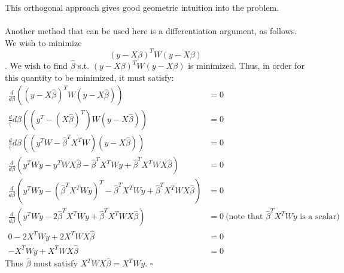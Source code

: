\documentclass[12pt]{article}
\newenvironment{problem}[2][Exercise]{\begin{trivlist}
\item[\hskip \labelsep {\bfseries #1}\hskip \labelsep {\bfseries #2.}]}{\end{trivlist}}
\begin{document}
\begin{problem}{A}
This orthogonal approach gives good geometric intuition into the problem. 
\\\\Another method that can be used here is a differentiation argument, as follows.
We wish to minimize $$(y - X\beta)^T W (y-X\beta)$$.
We wish to find $\hat{\beta}$ s.t. $(y - X\beta)^T W (y-X\beta)$ is minimized.
Thus, in order for this quantity to be minimized, it must satisfy:
\begin{align*}
\frac{d}{d\beta}\left((y - X\hat{\beta})^T W (y-X\hat{\beta}) \right)&= 0\\
\frac{d}({d\beta}\left((y^T - (X\hat{\beta})^T)W (y - X\hat{\beta}) \right)&= 0 \\
\frac{d}({d\beta}\left((y^TW - \hat{\beta}^TX^TW)(y - X\hat{\beta})\right) &= 0\\
\frac{d}{d\beta}\left(y^TWy - y^TWX\hat{\beta} - \hat{\beta}^TX^TWy + \hat{\beta}^TX^TWX\hat{\beta} \right)&= 0\\
\frac{d}{d\beta}\left(y^TWy -  (\hat{\beta}^TX^TWy)^T-\hat{\beta}^TX^TWy + \hat{\beta}^TX^TWX\hat{\beta} \right)&= 0\\
\frac{d}{d\beta}\left(y^TWy - 2\hat{\beta}^TX^TWy  + \hat{\beta}^TX^TWX\hat{\beta} \right) &= 0 \ \text{(note that  $\hat{\beta}^TX^TWy$ is a scalar)}\\
0 - 2X^TWy + 2X^TWX\hat{\beta} &= 0\\
-X^TWy + X^TWX\hat{\beta} &= 0
\end{align*}
Thus $\hat{\beta}$ must satisfy $ X^TWX\hat{\beta} = X^TWy$. $\square$
\end{problem}
\end{document}
